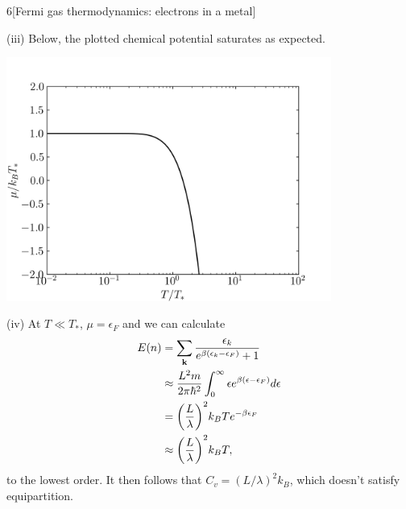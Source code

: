 \documentclass[12pt]{article}
\begin{document}
\begin{problem}{6}[Fermi gas thermodynamics: electrons in a metal]
\begin{solution}
(iii) Below, the plotted chemical potential saturates as expected.
\begin{center}
    \includegraphics[width=0.8\textwidth]{p6c.png} 
\end{center}

(iv) At $T\ll T_\ast$, $\mu=\epsilon_F$ and we can calculate
\begin{align}
    E(n)
    &=\sum_{\vb{k}}\frac{\epsilon_k}{e^{\beta(\epsilon_k-\epsilon_F)}+1}\notag\\
    &\approx\frac{L^2m}{2\pi\hbar^2}\int_0^\infty \epsilon
    e^{\beta(\epsilon-\epsilon_F)}d\epsilon\notag\\
    &=\qty(\frac{L}{\lambda})^2k_BTe^{-\beta\epsilon_F}\notag\\
    &\approx \qty(\frac{L}{\lambda})^2k_BT,
\end{align}
to the lowest order. It then follows that $C_v=(L/\lambda)^2k_B$, which doesn't
satisfy equipartition.
\end{solution}
\end{problem}
\newpage
\end{document}
